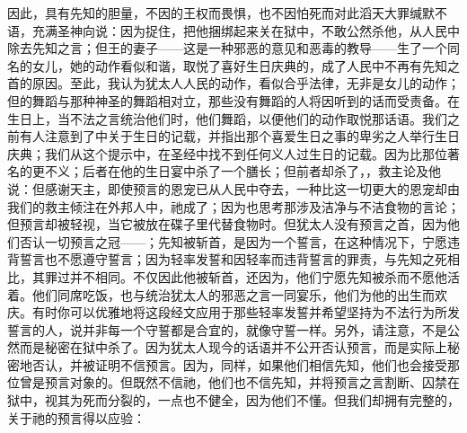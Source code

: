 因此，具有先知的胆量，不因的王权而畏惧，也不因怕死而对此滔天大罪缄默不语，充满圣神向说：因为捉住，把他捆绑起来关在狱中，不敢公然杀他，从人民中除去先知之言；但王的妻子——这是一种邪恶的意见和恶毒的教导——生了一个同名的女儿，她的动作看似和谐，取悦了喜好生日庆典的，成了人民中不再有先知之首的原因。至此，我认为犹太人人民的动作，看似合乎法律，无非是女儿的动作；但的舞蹈与那种神圣的舞蹈相对立，那些没有舞蹈的人将因听到的话而受责备。在生日上，当不法之言统治他们时，他们舞蹈，以便他们的动作取悦那话语。我们之前有人注意到了中关于生日的记载，并指出那个喜爱生日之事的卑劣之人举行生日庆典；我们从这个提示中，在圣经中找不到任何义人过生日的记载。因为比那位著名的更不义；后者在他的生日宴中杀了一个膳长；但前者却杀了，，救主论及他说：但感谢天主，即使预言的恩宠已从人民中夺去，一种比这一切更大的恩宠却由我们的救主倾注在外邦人中，祂成了；因为也思考那涉及洁净与不洁食物的言论；但预言却被轻视，当它被放在碟子里代替食物时。但犹太人没有预言之首，因为他们否认一切预言之冠——；先知被斩首，是因为一个誓言，在这种情况下，宁愿违背誓言也不愿遵守誓言；因为轻率发誓和因轻率而违背誓言的罪责，与先知之死相比，其罪过并不相同。不仅因此他被斩首，还因为，他们宁愿先知被杀而不愿他活着。他们同席吃饭，也与统治犹太人的邪恶之言一同宴乐，他们为他的出生而欢庆。有时你可以优雅地将这段经文应用于那些轻率发誓并希望坚持为不法行为所发誓言的人，说并非每一个守誓都是合宜的，就像守誓一样。另外，请注意，不是公然而是秘密在狱中杀了。因为犹太人现今的话语并不公开否认预言，而是实际上秘密地否认，并被证明不信预言。因为，同样，如果他们相信先知，他们也会接受那位曾是预言对象的。但既然不信祂，他们也不信先知，并将预言之言割断、囚禁在狱中，视其为死而分裂的，一点也不健全，因为他们不懂。但我们却拥有完整的，关于祂的预言得以应验：\par


